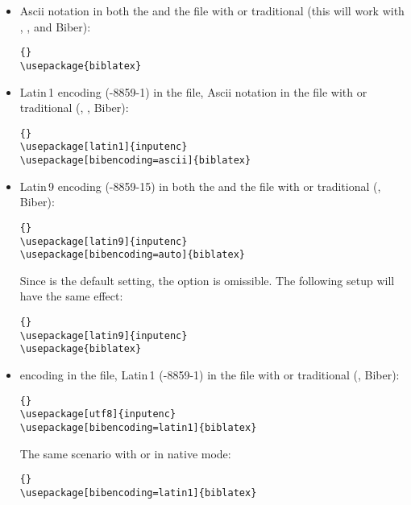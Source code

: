 \documentclass{ltxdockit}[2011/03/25]
\newcommand*{\biber}{Biber\xspace}
\begin{document}
\begin{itemize}
\setlength{\itemsep}{0pt}

\item Ascii notation in both the  and the  file with \pdftex or traditional \tex (this will work with \bibtex, , and \biber):

\begin{lstlisting}[style=latex]{}
\usepackage{biblatex}
\end{lstlisting}

\item Latin\,1 encoding (-8859-1) in the  file, Ascii notation in the  file with \pdftex or traditional \tex (\bibtex, , \biber):

\begin{lstlisting}[style=latex]{}
\usepackage[latin1]{inputenc}
\usepackage[bibencoding=ascii]{biblatex}
\end{lstlisting}

\item Latin\,9 encoding (-8859-15) in both the  and the  file with \pdftex or traditional \tex (, \biber):

\begin{lstlisting}[style=latex]{}
\usepackage[latin9]{inputenc}
\usepackage[bibencoding=auto]{biblatex}
\end{lstlisting}
%
Since  is the default setting, the option is omissible. The following setup will have the same effect:

\begin{lstlisting}[style=latex]{}
\usepackage[latin9]{inputenc}
\usepackage{biblatex}
\end{lstlisting}

\item \utf encoding in the  file, Latin\,1 (-8859-1) in the  file with \pdftex or traditional \tex (, \biber):

\begin{lstlisting}[style=latex]{}
\usepackage[utf8]{inputenc}
\usepackage[bibencoding=latin1]{biblatex}
\end{lstlisting}

The same scenario with \xetex or \luatex in native \utf mode:

\begin{lstlisting}[style=latex]{}
\usepackage[bibencoding=latin1]{biblatex}
\end{lstlisting}


\end{itemize}
\end{document}
